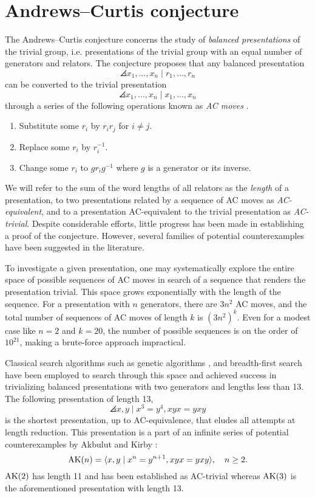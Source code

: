 
\section{Andrews--Curtis conjecture\label{sec:AC}}

The Andrews--Curtis conjecture concerns the study of \textit{balanced presentations} of the trivial group, i.e.
presentations of the trivial group with an equal number of generators and relators.
The conjecture proposes that any balanced presentation
\[
\angles{x_1, \dots, x_n \mid r_1, \dots, r_n}
\]
can be converted to the trivial presentation
\[
\angles{x_1, \dots, x_n \mid x_1, \dots, x_n}
\]
through a series of the following operations known as \textit{AC moves} \cite{Andrews--Curtis}.
\begin{enumerate}[label=(AC\arabic*)]
	\item Substitute some $r_i$ by $r_i r_j$ for $i \neq j$.
	\item Replace some $r_i$ by $r_i^{-1}$.
	\item Change some $r_i$ to $g r_i g^{-1}$ where $g$ is a generator or its inverse.
\end{enumerate}
We will refer to the sum of the word lengths of all relators as the \textit{length} of a presentation, to two presentations related by a sequence of AC moves as \textit{AC-equivalent}, and to a presentation AC-equivalent to the trivial presentation as \textit{AC-trivial}.
Despite considerable efforts, little progress has been made in establishing a proof of the conjecture.
However, several families of potential counterexamples have been suggested in the literature.

To investigate a given presentation, one may systematically explore the entire space of possible sequences of AC moves in search of a sequence that renders the presentation trivial.
This space grows exponentially with the length of the sequence.
For a presentation with $n$ generators, there are $3n^2$ AC moves, and the total number of sequences of AC moves of length $k$ is $(3n^2)^k$.
Even for a modest case like $n=2$ and $k=20$, the number of possible sequences is on the order of $10^{21}$, making a brute-force approach impractical.
\newline

Classical search algorithms such as genetic algorithms \cite{genetic}, and breadth-first search \cite{bfs-ac} have been employed to search through this space and achieved success in trivializing balanced presentations with two generators and lengths less than 13.
The following presentation of length 13,
\[
\angles{x, y \mid x^3 = y^4, xyx = yxy}
\]
is the shortest presentation, up to AC-equivalence, that eludes all attempts at length reduction.
This presentation is a part of an infinite series of potential counterexamples by Akbulut and Kirby \cite{Akbulut--Kirby}:
\[
\text{AK}(n) = \langle x, y \mid x^n = y^{n+1}, xyx = yxy\rangle, \quad n \geq 2.
\]
$\text{AK}(2)$ has length 11 and has been established as AC-trivial \cite{genetic} whereas $\text{AK}(3)$ is the aforementioned presentation with length 13.
\newline

